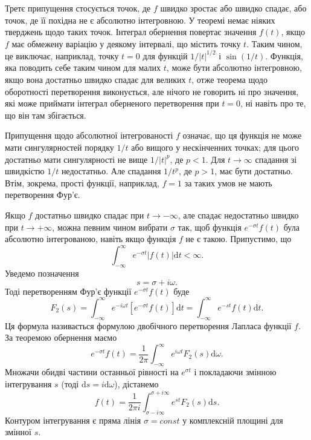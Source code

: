 \documentclass[14pt,twoside]{extreport}
\theoremstyle{mystyle}
\numberwithin{equation}{chapter}
\begin{document}
Третє припущення стосується точок, де $f$ швидко зростає або швидко спадає, або точок, де її похідна не є абсолютно інтегровною. У теоремі немає ніяких тверджень щодо таких точок. Інтеграл обернення повертає значення $f(t)$, якщо $f$ має обмежену варіацію у деякому інтервалі, що містить точку $t$. Таким чином, це виключає, наприклад, точку $t=0$ для функцій $1/|t|^{1/2}$ і $\sin(1/t)$. Функція, яка поводить себе таким чином для малих $t$, може бути абсолютно інтегровною, якщо вона достатньо швидко спадає для великих $t$, отже теорема щодо оборотності перетворення виконується, але нічого не говорить ні про значення, які може приймати інтеграл оберненого перетворення при $t=0$, ні навіть про те, що він там збігається.

Припущення щодо абсолютної інтегрованості $f$ означає, що ця функція не може мати сингулярностей порядку $1/t$ або вищого у нескінченних точках; для цього достатньо мати сингулярності не вище $1/|t|^{p}$, де $p<1$. Для $t\to\infty$ спадання зі швидкістю $1/t$ недостатньо. Але спадання $1/t^{p}$, де $p>1$, має бути достатньо. Втім, зокрема, прості функції, наприклад, $f=1$ за таких умов не мають перетворення Фур'є.

Якщо $f$ достатньо швидко спадає при $t\to -\infty$, але спадає недостатньо швидко при $t\to +\infty$, можна певним чином вибрати $\sigma$ так, щоб функція $e^{-\sigma t}f(t)$ була абсолютно інтегрованою, навіть якщо функція $f$ не є такою. Припустимо, що
\begin{equation*}
	\displaystyle \int_{-\infty}^{\infty}e^{-\sigma t}|f(t)|\mathrm{d}t<\infty.
\end{equation*}
Уведемо позначення
\begin{equation*}
	 s=\sigma+i\omega.
\end{equation*}
Тоді перетворенням Фур'є функції $e^{-\sigma t}f(t)$ буде
\begin{equation*}
	\displaystyle F_{2}(s)=\int_{-\infty}^{\infty}e^{-i\omega t}[e^{-\sigma t}f(t)]\mathrm{d}t=\int_{-\infty}^{\infty}e^{-st}f(t)\mathrm{d}t.
\end{equation*}
Ця формула називається формулою двобічного перетворення Лапласа функції $f$. За теоремою обернення маємо
\begin{equation*}
	 e^{-\sigma t}f(t)=\dfrac{1}{2 \pi}\int_{-\infty}^{\infty}e^{i\omega t}F_{2}(s)\mathrm{d}\omega.
\end{equation*}
Множачи обидві частини останньої рівності на $e^{\sigma t}$ і покладаючи змінною інтегрування $s$ (тоді $\mathrm{d}s=i\mathrm{d}\omega$), дістанемо
\begin{equation*}
	f(t)=\dfrac{1}{2\displaystyle \pi i}\int_{\sigma-i\infty}^{\sigma+i\infty}e^{st}F_{2}(s)\mathrm{d}s.
\end{equation*}
Контуром інтегрування є пряма лінія $\sigma = const$ у комплексній площині для змінної $s$.
\end{document}
